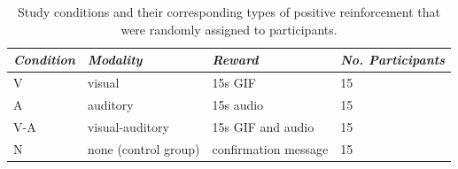 \begin{table}[H]
\begin{center}
  \begin{tabular}{l l l l}
    {\small \textit{Condition}} & {\small\textit{Modality}} & {\small \textit{Reward}} & {\small \textit{No. Participants}}  \\ \hline
    V & visual & 15s GIF & 15 \\
    A & auditory & 15s audio & 15 \\
    V-A & visual-auditory & 15s GIF and audio & 15 \\
    N & none (control group) & confirmation message & 15 \\
  \end{tabular}
  \caption{Study conditions and their corresponding types of positive reinforcement that were randomly assigned to participants.}~\label{table:precise_rewards}
\end{center}
\end{table}


